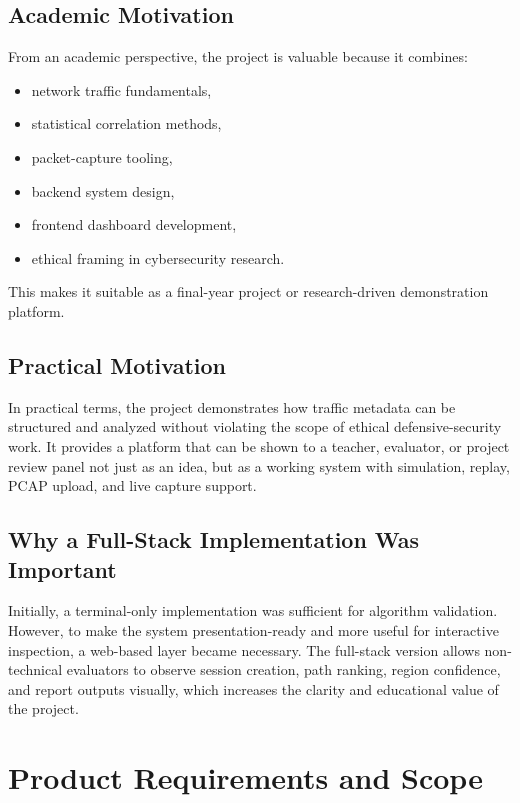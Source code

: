 \documentclass[12pt,a4paper]{report}
\begin{document}
\section{Academic Motivation}
From an academic perspective, the project is valuable because it combines:
\begin{itemize}[leftmargin=1.5em]
    \item network traffic fundamentals,
    \item statistical correlation methods,
    \item packet-capture tooling,
    \item backend system design,
    \item frontend dashboard development,
    \item ethical framing in cybersecurity research.
\end{itemize}
This makes it suitable as a final-year project or research-driven demonstration platform.

\section{Practical Motivation}
In practical terms, the project demonstrates how traffic metadata can be structured and analyzed without violating the scope of ethical defensive-security work. It provides a platform that can be shown to a teacher, evaluator, or project review panel not just as an idea, but as a working system with simulation, replay, PCAP upload, and live capture support.

\section{Why a Full-Stack Implementation Was Important}
Initially, a terminal-only implementation was sufficient for algorithm validation. However, to make the system presentation-ready and more useful for interactive inspection, a web-based layer became necessary. The full-stack version allows non-technical evaluators to observe session creation, path ranking, region confidence, and report outputs visually, which increases the clarity and educational value of the project.

\chapter{Product Requirements and Scope}
\end{document}

